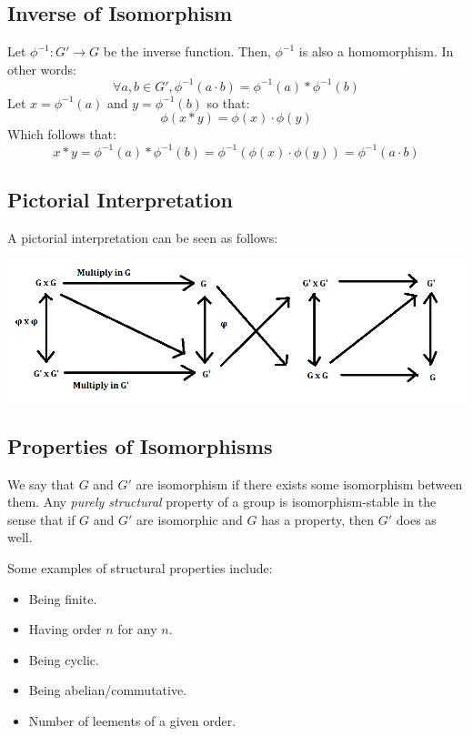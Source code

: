 \documentclass[letterpaper]{article}
\begin{document}
\subsection{Inverse of Isomorphism}
Let $\phi^{-1}: G' \to G$ be the inverse function. Then, $\phi^{-1}$ is also a homomorphism. In other words: 
\[\forall a, b \in G', \phi^{-1}(a \cdot b) = \phi^{-1}(a) * \phi^{-1}(b)\]
Let $x = \phi^{-1}(a)$ and $y = \phi^{-1}(b)$ so that: 
\[\phi(x * y) = \phi(x) \cdot \phi(y)\]
Which follows that: 
\[x * y = \phi^{-1}(a) * \phi^{-1}(b) = \phi^{-1}(\phi(x) \cdot \phi(y)) = \phi^{-1}(a \cdot b)\]

\subsection{Pictorial Interpretation}
A pictorial interpretation can be seen as follows: 
\begin{center}
    \includegraphics[scale=0.6]{assets/iso_diagram.png}
\end{center}

\subsection{Properties of Isomorphisms}
We say that $G$ and $G'$ are isomorphism if there exists some isomorphism between them. Any \emph{purely structural} property of a group is isomorphism-stable in the sense that if $G$ and $G'$ are isomorphic and $G$ has a property, then $G'$ does as well. 

\bigskip 

Some examples of structural properties include: 
\begin{itemize}
    \item Being finite. 
    \item Having order $n$ for any $n$. 
    \item Being cyclic. 
    \item Being abelian/commutative. 
    \item Number of leements of a given order. 
\end{itemize}
\end{document}
